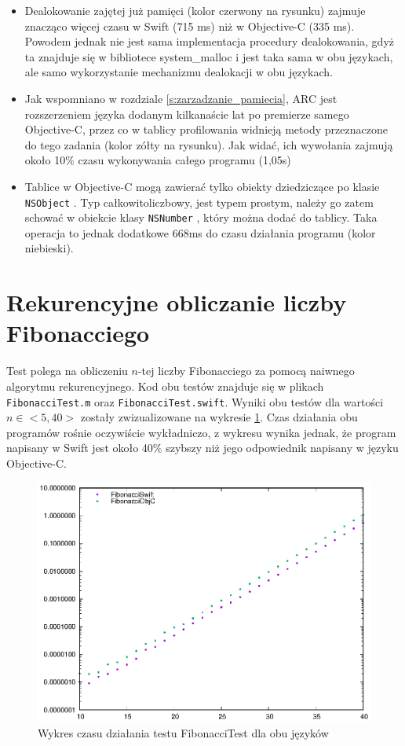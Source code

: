 \documentclass[mgr, shortabstract]{iithesis}
\newcommand{\objcinline}[1]{
    \texttt{#1}
}
\begin{document}
\begin{itemize}
    \item Dealokowanie zajętej już pamięci (kolor czerwony na rysunku) zajmuje znacząco więcej czasu w Swift (715 ms) niż w Objective-C (335 ms). Powodem jednak nie jest sama implementacja procedury dealokowania, gdyż ta znajduje się w bibliotece \textsf{system\_malloc} i jest taka sama w obu językach, ale samo wykorzystanie mechanizmu dealokacji w obu językach.
    \item Jak wspomniano w rozdziale \ref{s:zarzadzanie_pamiecia}, ARC jest rozszerzeniem języka dodanym kilkanaście lat po premierze samego Objective-C, przez co w tablicy profilowania widnieją metody przeznaczone do tego zadania (kolor zółty na rysunku). Jak widać, ich wywołania zajmują około 10\% czasu wykonywania całego programu (1,05s)
    \item Tablice w Objective-C mogą zawierać tylko obiekty dziedziczące po klasie \objcinline{NSObject}. Typ całkowitoliczbowy, jest typem prostym, należy go zatem schować w obiekcie klasy \objcinline{NSNumber}, który można dodać do tablicy. Taka operacja to jednak dodatkowe 668ms do czasu działania programu (kolor niebieski).
\end{itemize}

\section{Rekurencyjne obliczanie liczby Fibonacciego}

Test polega na obliczeniu $n$-tej liczby Fibonacciego za pomocą naiwnego algorytmu rekurencyjnego. Kod obu testów znajduje się w plikach \texttt{FibonacciTest.m} oraz \texttt{FibonacciTest.swift}. Wyniki obu testów dla wartości $n \in <5, 40>$ zostały zwizualizowane na wykresie \ref{p:fibonacci}. Czas działania obu programów rośnie oczywiście wykładniczo, z wykresu wynika jednak, że program napisany w Swift jest około 40\% szybszy niż jego odpowiednik napisany w języku Objective-C.

\begin{figure}
    \includegraphics{plots/Fibonacci.eps}
    \caption{Wykres czasu działania testu FibonacciTest dla obu języków}
    \label{p:fibonacci}
\end{figure}
\end{document}
